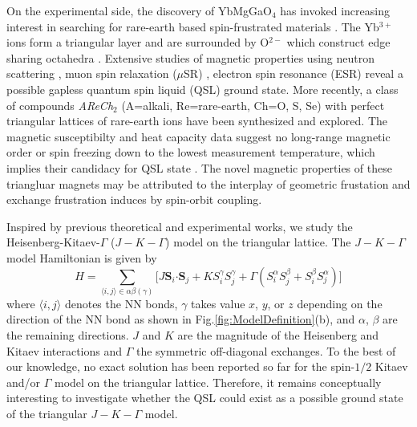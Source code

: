\documentclass[aps,prb,reprint,groupedaddress,showpacs,amsfonts,amsmath,amssymb,superscriptaddress]{revtex4-1}
\begin{document}
On the experimental side, the discovery of YbMgGaO$_4$ has invoked increasing interest in searching for rare-earth based spin-frustrated materials \cite{srep16419,PhysRevLett.115.167203,PhysRevB.94.035107,PhysRevB.96.054445,PhysRevB.97.184413,PhysRevB.97.125105,PhysRevB.96.075105,PhysRevLett.119.157201}. The Yb$^{3+}$ ions form a triangular layer and are surrounded by O$^{2-}$ which construct edge sharing octahedra \cite{srep16419,PhysRevLett.115.167203}. Extensive studies of magnetic properties using neutron scattering \cite{Nature20614,nphys3971,PhysRevLett.117.267202,PhysRevX.8.031001}, muon spin relaxation ($\mu$SR) \cite{PhysRevLett.117.097201}, electron spin resonance (ESR) \cite{PhysRevLett.115.167203} reveal a possible gapless quantum spin liquid (QSL) ground state. More recently, a class of compounds \emph{AReCh}$_2$ (A=alkali, Re=rare-earth, Ch=O, S, Se) with perfect triangular lattices of rare-earth ions have been synthesized and explored. The magnetic susceptibilty and heat capacity data suggest no long-range magnetic order or spin freezing down to the lowest measurement temperature, which implies their candidacy for QSL state \cite{acsmaterialslett.9b00464,PhysRevMaterials.3.114413,arXiv1911.08036,Liu_2018,arXiv1911.12712}. The novel magnetic properties of these triangluar magnets may be attributed to the interplay of geometric frustation and exchange frustration induces by spin-orbit coupling.

Inspired by previous theoretical and experimental works, we study the Heisenberg-Kitaev-$\Gamma$ ($J-K-\Gamma$) model on the triangular lattice. The $J-K-\Gamma$ model Hamiltonian is given by
\begin{equation}
    H=\sum_{\langle i,j \rangle \in \alpha \beta (\gamma)} \lbrack J \bm{S}_i \bm{\cdot} \bm{S}_j + K S_i^{\gamma} S_j^{\gamma} + \Gamma (S_i^{\alpha} S_j^{\beta} + S_i^{\beta} S_j^{\alpha}) \rbrack
    \label{eq:Hamiltonian}
\end{equation}
where $\langle i,j \rangle$ denotes the NN bonds, $\gamma$ takes value $x$, $y$, or $z$ depending on the direction of the NN bond as shown in Fig.\ref{fig:ModelDefinition}(b), and $\alpha$, $\beta$ are the remaining directions. $J$ and $K$ are the magnitude of the Heisenberg and Kitaev interactions and $\Gamma$ the symmetric off-diagonal exchanges. To the best of our knowledge, no exact solution has been reported so far for the spin-$1/2$ Kitaev and/or $\Gamma$ model on the triangular lattice. Therefore, it remains conceptually interesting to investigate whether the QSL could exist as a possible ground state of the triangular $J-K-\Gamma$ model.
\end{document}
